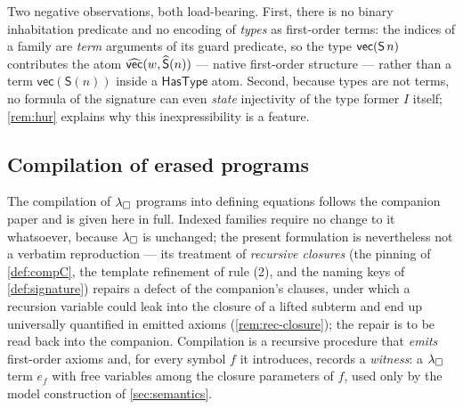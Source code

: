 Two negative observations, both load-bearing.  First, there is no binary
inhabitation predicate and no encoding of \emph{types} as first-order
terms: the indices of a family are \emph{term} arguments of its guard
predicate, so the type $\mathsf{vec}(\mathsf{S}\,n)$ contributes the atom
$\widehat{\mathsf{vec}}(w, \widehat{\mathsf{S}}(n))$ --- native first-order structure ---
rather than a term $\mathsf{vec}(\mathsf{S}(n))$ inside a
$\mathsf{HasType}$ atom.  Second, because types are not terms, no
formula of the signature can even \emph{state} injectivity of the type
former $I$ itself; \cref{rem:hur} explains why this inexpressibility is
a feature.

\subsection{Compilation of erased programs}
\label{sec:translation-compile}

The compilation of $\lambda_{\square}$ programs into defining equations follows
the companion paper and is given here in full.  Indexed families
require no change to it whatsoever, because $\lambda_{\square}$ is unchanged; the
present formulation is nevertheless not a verbatim reproduction ---
its treatment of \emph{recursive closures} (the pinning of
\cref{def:compC}, the template refinement of rule (2), and the naming
keys of \cref{def:signature}) repairs a defect of the companion's
clauses, under which a recursion variable could leak into the closure
of a lifted subterm and end up universally quantified in emitted
axioms (\cref{rem:rec-closure}); the repair is to be read back into
the companion.  Compilation is a recursive procedure that \emph{emits}
first-order axioms and, for every symbol $f$ it introduces, records a
\emph{witness}: a $\lambda_{\square}$ term $e_f$ with free variables among the
closure parameters of $f$, used only by the model construction of
\cref{sec:semantics}.

